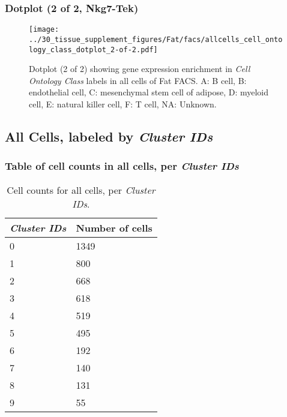 \subsubsection{Dotplot (2 of 2, Nkg7-Tek)}
\begin{figure}[h]
\centering
\texttt{[image: ../30\_tissue\_supplement\_figures/Fat/facs/allcells\_cell\_ontology\_class\_dotplot\_2-of-2.pdf]}

\caption{ Dotplot (2 of 2)  showing gene expression enrichment in \emph{Cell Ontology Class} labels in all cells of Fat FACS. A: B cell, B: endothelial cell, C: mesenchymal stem cell of adipose, D: myeloid cell, E: natural killer cell, F: T cell, NA: Unknown.}
\end{figure}


\clearpage

\subsection{All Cells, labeled by \emph{Cluster IDs}}
\subsubsection{Table of cell counts in all cells, per \emph{Cluster IDs}}\begin{table}[h]
\centering
\label{my-label}
\begin{tabular}{@{}ll@{}}
\toprule

\emph{Cluster IDs}& Number of cells \\ \midrule
0 & 1349 \\

1 & 800 \\

2 & 668 \\

3 & 618 \\

4 & 519 \\

5 & 495 \\

6 & 192 \\

7 & 140 \\

8 & 131 \\

9 & 55 \\
\bottomrule
\end{tabular}
\caption{Cell counts for all cells, per \emph{Cluster IDs}.}
\end{table}

